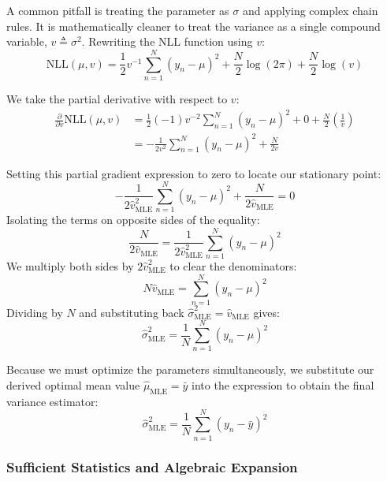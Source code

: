 \documentclass{article}
\begin{document}
A common pitfall is treating the parameter as $\sigma$ and applying complex chain rules. It is mathematically cleaner to treat the variance as a single compound variable, $v \triangleq \sigma^2$. Rewriting the NLL function using $v$:
\begin{equation}
\text{NLL}(\mu, v) = \frac{1}{2}v^{-1}\sum_{n=1}^N (y_n - \mu)^2 + \frac{N}{2}\log(2\pi) + \frac{N}{2}\log(v)
\end{equation}

We take the partial derivative with respect to $v$:
\begin{align*}
\frac{\partial}{\partial v}\text{NLL}(\mu, v) &= \frac{1}{2}(-1)v^{-2}\sum_{n=1}^N (y_n - \mu)^2 + 0 + \frac{N}{2}\left(\frac{1}{v}\right) \\
&= -\frac{1}{2v^2}\sum_{n=1}^N (y_n - \mu)^2 + \frac{N}{2v}
\end{align*}

Setting this partial gradient expression to zero to locate our stationary point:
\begin{equation}
-\frac{1}{2\hat{v}_{\text{MLE}}^2}\sum_{n=1}^N (y_n - \mu)^2 + \frac{N}{2\hat{v}_{\text{MLE}}} = 0
\end{equation}
Isolating the terms on opposite sides of the equality:
\begin{equation}
\frac{N}{2\hat{v}_{\text{MLE}}} = \frac{1}{2\hat{v}_{\text{MLE}}^2}\sum_{n=1}^N (y_n - \mu)^2
\end{equation}
We multiply both sides by $2\hat{v}_{\text{MLE}}^2$ to clear the denominators:
\begin{equation}
N\hat{v}_{\text{MLE}} = \sum_{n=1}^N (y_n - \mu)^2
\end{equation}
Dividing by $N$ and substituting back $\hat{\sigma}^2_{\text{MLE}} = \hat{v}_{\text{MLE}}$ gives:
\begin{equation}
\hat{\sigma}^2_{\text{MLE}} = \frac{1}{N}\sum_{n=1}^N (y_n - \mu)^2
\end{equation}

Because we must optimize the parameters simultaneously, we substitute our derived optimal mean value $\hat{\mu}_{\text{MLE}} = \bar{y}$ into the expression to obtain the final variance estimator:
\begin{equation}
\hat{\sigma}^2_{\text{MLE}} = \frac{1}{N}\sum_{n=1}^N (y_n - \bar{y})^2
\end{equation}

\subsubsection{Sufficient Statistics and Algebraic Expansion}
\end{document}
